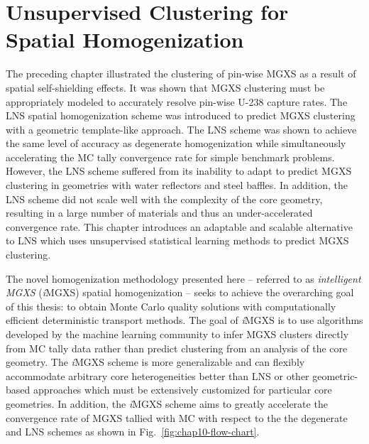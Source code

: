\chapter{Unsupervised Clustering for Spatial Homogenization}
\label{chap:unsupervised}

The preceding chapter illustrated the clustering of pin-wise \ac{MGXS} as a result of spatial self-shielding effects. It was shown that \ac{MGXS} clustering must be appropriately modeled to accurately resolve pin-wise U-238 capture rates. The \ac{LNS} spatial homogenization scheme was introduced to predict \ac{MGXS} clustering with a geometric template-like approach. The \ac{LNS} scheme was shown to achieve the same level of accuracy as degenerate homogenization while simultaneously accelerating the \ac{MC} tally convergence rate for simple benchmark problems. However, the \ac{LNS} scheme suffered from its inability to adapt to predict \ac{MGXS} clustering in geometries with water reflectors and steel baffles. In addition, the \ac{LNS} scheme did not scale well with the complexity of the core geometry, resulting in a large number of materials and thus an under-accelerated convergence rate. This chapter introduces an adaptable and scalable alternative to \ac{LNS} which uses unsupervised statistical learning methods to predict \ac{MGXS} clustering.

The novel homogenization methodology presented here -- referred to as \textit{intelligent \ac{MGXS}} (\textit{i}\ac{MGXS}) spatial homogenization -- seeks to achieve the overarching goal of this thesis: to obtain Monte Carlo quality solutions with computationally efficient deterministic transport methods. The goal of \textit{i}\ac{MGXS} is to use algorithms developed by the machine learning community to infer \ac{MGXS} clusters directly from \ac{MC} tally data rather than predict clustering from an analysis of the core geometry. The \textit{i}\ac{MGXS} scheme is more generalizable and can flexibly accommodate arbitrary core heterogeneities better than \ac{LNS} or other geometric-based approaches which must be extensively customized for particular core geometries. In addition, the \textit{i}\ac{MGXS} scheme aims to greatly accelerate the convergence rate of \ac{MGXS} tallied with \ac{MC} with respect to the the degenerate and \ac{LNS} schemes as shown in Fig.~\ref{fig:chap10-flow-chart}.

